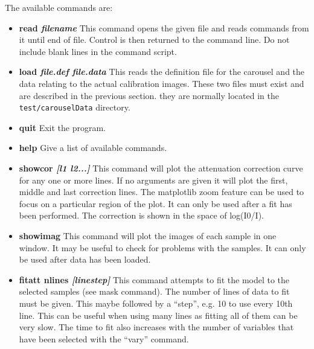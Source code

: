 \documentclass[a4paper,12pt]{article}
\begin{document}
The available commands are:
\begin{itemize}
\item{\bf read \it{filename}} This command opens the given file and reads commands from it until end of file.
Control is then returned to the command line. Do not include blank lines in the command script.

\item{\bf load \it{file.def} \it{file.data}} This reads the definition file for the carousel and the data
relating to the actual calibration images. These two files must exist and are described in the previous section.
they are normally located in the \texttt{test/carouselData} directory.

\item{\bf quit} Exit the program.

\item{\bf help} Give a list of available commands.

\item{\bf showcor \it{[l1 l2...]}} This command will plot the attenuation correction curve for any one or more lines. If no arguments are given
it will plot the first, middle and last correction lines. The matplotlib zoom feature can be used to focus on a particular region of the
plot. It can only be used after a fit has been performed.
The correction is shown in the space of log(I0/I).

\item{\bf showimag} This command will plot the images of each sample in one window. It may be useful to check for problems with the samples.
It can only be used after data has been loaded.

\item{\bf fitatt nlines \it{[linestep]}} This command attempts to fit the model to the selected samples (see mask command). The
number of lines of data to fit must be given. This maybe followed by a ``step'', e.g. 10 to use every 10th line.
This can be useful when using many lines as fitting all of them can be very slow.
The time to fit also increases with the number of variables that have been selected with the ``vary'' command.


\end{itemize}
\end{document}
